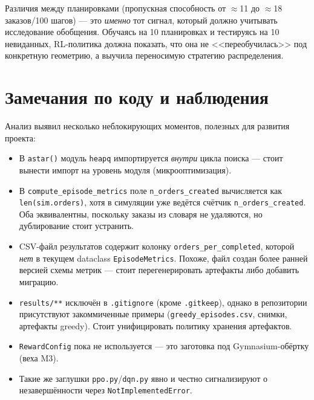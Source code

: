 \documentclass[11pt,a4paper]{article}
\newcommand{\code}[1]{\texttt{#1}}
\begin{document}
\begin{tcolorbox}[colback=accent!5,colframe=accent!60,title=Интерпретация]
Различия между планировками (пропускная способность от $\approx$11 до
$\approx$18 заказов/100 шагов) — это \emph{именно} тот сигнал, который должно
учитывать исследование обобщения. Обучаясь на 10 планировках и тестируясь на 10
невиданных, RL-политика должна показать, что она не <<переобучилась>> под
конкретную геометрию, а выучила переносимую стратегию распределения.
\end{tcolorbox}

\section{Замечания по коду и наблюдения}
Анализ выявил несколько неблокирующих моментов, полезных для развития проекта:
\begin{itemize}[nosep]
\item В \code{astar()} модуль \code{heapq} импортируется \emph{внутри} цикла
поиска — стоит вынести импорт на уровень модуля (микрооптимизация).
\item В \code{compute\_episode\_metrics} поле \code{n\_orders\_created}
вычисляется как \code{len(sim.orders)}, хотя в симуляции уже ведётся счётчик
\code{n\_orders\_created}. Оба эквивалентны, поскольку заказы из словаря не
удаляются, но дублирование стоит устранить.
\item CSV-файл результатов содержит колонку \code{orders\_per\_completed}, которой
\emph{нет} в текущем dataclass \code{EpisodeMetrics}. Похоже, файл создан более
ранней версией схемы метрик — стоит перегенерировать артефакты либо добавить
миграцию.
\item \code{results/**} исключён в \code{.gitignore} (кроме \code{.gitkeep}),
однако в репозитории присутствуют закоммиченные примеры
(\code{greedy\_episodes.csv}, снимки, артефакты greedy). Стоит унифицировать
политику хранения артефактов.
\item \code{RewardConfig} пока не используется — это заготовка под
Gymnasium-обёртку (веха M3).
\item Такие же заглушки \code{ppo.py}/\code{dqn.py} явно и честно сигнализируют
о незавершённости через \code{NotImplementedError}.
\end{itemize}

\end{document}
